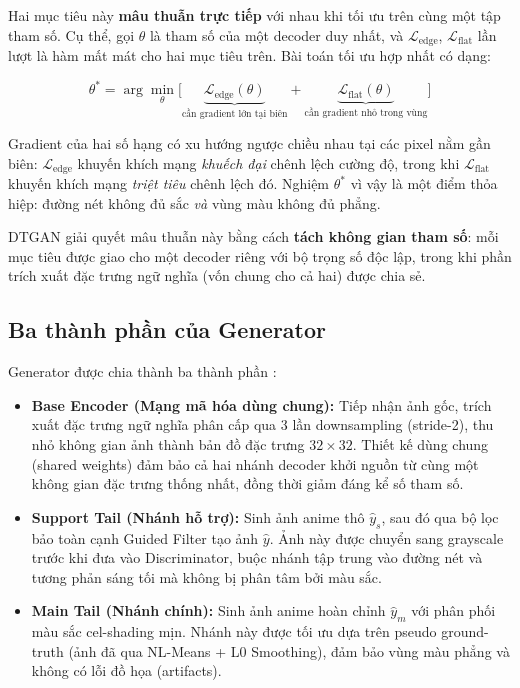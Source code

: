 Hai mục tiêu này \textbf{mâu thuẫn trực tiếp} với nhau khi tối ưu trên cùng một tập tham số. Cụ thể, gọi $\theta$ là tham số của một decoder duy nhất, và $\mathcal{L}_{\text{edge}}$, $\mathcal{L}_{\text{flat}}$ lần lượt là hàm mất mát cho hai mục tiêu trên. Bài toán tối ưu hợp nhất có dạng:

\begin{equation}
\label{eq:conflict_objective}
\theta^* = \arg\min_{\theta} \Big[ \underbrace{\mathcal{L}_{\text{edge}}(\theta)}_{\text{cần gradient lớn tại biên}} + \underbrace{\mathcal{L}_{\text{flat}}(\theta)}_{\text{cần gradient nhỏ trong vùng}} \Big]
\end{equation}

Gradient của hai số hạng có xu hướng ngược chiều nhau tại các pixel nằm gần biên: $\mathcal{L}_{\text{edge}}$ khuyến khích mạng \textit{khuếch đại} chênh lệch cường độ, trong khi $\mathcal{L}_{\text{flat}}$ khuyến khích mạng \textit{triệt tiêu} chênh lệch đó. Nghiệm $\theta^*$ vì vậy là một điểm thỏa hiệp: đường nét không đủ sắc \textit{và} vùng màu không đủ phẳng.

DTGAN giải quyết mâu thuẫn này bằng cách \textbf{tách không gian tham số}: mỗi mục tiêu được giao cho một decoder riêng với bộ trọng số độc lập, trong khi phần trích xuất đặc trưng ngữ nghĩa (vốn chung cho cả hai) được chia sẻ.

\subsection{Ba thành phần của Generator}
\label{subsec:three_components}

Generator được chia thành ba thành phần \cite{Liu2024}:

\begin{itemize}
    \item \textbf{Base Encoder (Mạng mã hóa dùng chung):} Tiếp nhận ảnh gốc, trích xuất đặc trưng ngữ nghĩa phân cấp qua 3 lần downsampling (stride-2), thu nhỏ không gian ảnh thành bản đồ đặc trưng $32 \times 32$. Thiết kế dùng chung (shared weights) đảm bảo cả hai nhánh decoder khởi nguồn từ cùng một không gian đặc trưng thống nhất, đồng thời giảm đáng kể số tham số.
    \item \textbf{Support Tail (Nhánh hỗ trợ):} Sinh ảnh anime thô $\widehat{y}_s$, sau đó qua bộ lọc bảo toàn cạnh Guided Filter tạo ảnh $\widehat{y}$. Ảnh này được chuyển sang grayscale trước khi đưa vào Discriminator, buộc nhánh tập trung vào đường nét và tương phản sáng tối mà không bị phân tâm bởi màu sắc.
    \item \textbf{Main Tail (Nhánh chính):} Sinh ảnh anime hoàn chỉnh $\widehat{y}_m$ với phân phối màu sắc cel-shading mịn. Nhánh này được tối ưu dựa trên pseudo ground-truth (ảnh đã qua NL-Means + L0 Smoothing), đảm bảo vùng màu phẳng và không có lỗi đồ họa (artifacts).
\end{itemize}


